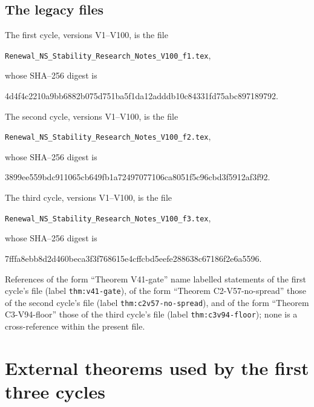 \documentclass[11pt]{article}
\theoremstyle{plain}
\theoremstyle{definition}
\theoremstyle{remark}
\begin{document}
\subsection{The legacy files}

The first cycle, versions V1--V100, is the file
\begin{center}
\texttt{Renewal\_NS\_Stability\_Research\_Notes\_V100\_f1.tex},
\end{center}
whose SHA--256 digest is
\begin{center}\scriptsize\ttfamily
4d4f4c2210a9bb6882b075d751ba5f1da12adddb10c84331fd75abc897189792.
\end{center}
The second cycle, versions V1--V100, is the file
\begin{center}
\texttt{Renewal\_NS\_Stability\_Research\_Notes\_V100\_f2.tex},
\end{center}
whose SHA--256 digest is
\begin{center}\scriptsize\ttfamily
3899ee559bdc911065cb649fb1a72497077106ca8051f5c96cbd3f5912af3f92.
\end{center}
The third cycle, versions V1--V100, is the file
\begin{center}
\texttt{Renewal\_NS\_Stability\_Research\_Notes\_V100\_f3.tex},
\end{center}
whose SHA--256 digest is
\begin{center}\scriptsize\ttfamily
7fffa8ebb8d2d460beca3f3f768615e4cffcbd5eefe288638c67186f2e6a5596.
\end{center}
References of the form ``Theorem V41-gate'' name labelled statements
of the first cycle's file (label \texttt{thm:v41-gate}), of the form
``Theorem C2-V57-no-spread'' those of the second cycle's file (label
\texttt{thm:c2v57-no-spread}), and of the form ``Theorem C3-V94-floor''
those of the third cycle's file (label \texttt{thm:c3v94-floor}); none
is a cross-reference within the present file.

\section{External theorems used by the first three cycles}
\label{sec:c4v1-imports}
\end{document}
